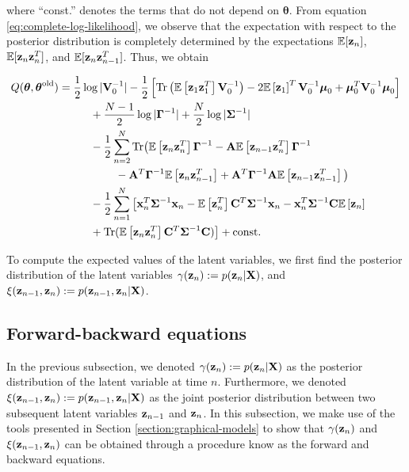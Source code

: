 \documentclass[12pt, oneside]{book}
\numberwithin{equation}{section}
\newcommand{\expectation}[1]{\mathbb{E}\left[#1\right]}
\newcommand{\x}{{\bf x}}
\newcommand{\z}{{\bf z}}
\begin{document}
{where ``const.'' denotes the terms that do not depend on $\boldsymbol{\theta}$. From equation \eqref{eq:complete-log-likelihood}, we observe that the expectation with respect to the posterior distribution is completely determined by the expectations $\mathbb{E}[\z_n]$, $\mathbb{E}[\z_n\z_{n}^{T}]$, and  $\mathbb{E}[\z_n\z_{n-1}^{T}]$. Thus, we obtain

\begin{align}
	Q(\boldsymbol\theta, \boldsymbol\theta^\text{old}) &= \frac{1}{2}\log \vert
	  {\bf V}_0^{-1}\vert -\frac{1}{2}\left[\text{Tr}\left(\mathbb{E}\left[\z_1 \z_1^T\right] {\bf V}_0^{-1}\right) -2 \mathbb{E}\left[\z_1\right]^T{\bf V}_0^{-1}\boldsymbol\mu_0 + \boldsymbol\mu_0^T {\bf V}_0^{-1}\boldsymbol\mu_0\right] \nonumber \\
	  &\hspace{1cm}+ \frac{N-1}{2}\log\vert\boldsymbol\Gamma^{-1}\vert + \frac{N}{2}\log\vert \boldsymbol\Sigma^{-1}\vert \nonumber \\
	  &\hspace{1cm}-\frac{1}{2} \sum_{n=2}^{N}\text{Tr}\big(\expectation{\z_n\z_n^T}\boldsymbol\Gamma^{-1} - {\bf A}\expectation{\z_{n-1}\z_n^T}\boldsymbol\Gamma^{-1} \nonumber\\
	  &\hspace{1.8cm} - {\bf A}^T\boldsymbol{\Gamma}^{-1}\expectation{\z_n\z_{n-1}^T} + {\bf A}^T\boldsymbol\Gamma^{-1}{\bf A}\expectation{\z_{n-1}\z_{n-1}^T}\big) \nonumber\\
	  &\hspace{1cm}-\frac{1}{2}\sum_{n=1}^N\big[\x_n^T\boldsymbol{\Sigma}^{-1}\x_n-\expectation{\z_n^T}{\bf C}^T \boldsymbol\Sigma^{-1}\x_n - \x_n^T\boldsymbol\Sigma^{-1}{\bf C}\expectation{\z_n} \nonumber\\
	  &\hspace{1cm} + \text{Tr}(\mathbb{E}\left[\z_n\z_n^T\right]{\bf C}^T\boldsymbol\Sigma^{-1}{\bf C})\big] + \text{const.}  \label{eq:Q-LDS}
\end{align}


To compute the expected values of the latent variables, we first find the posterior distribution of the latent variables $\gamma(\z_n) := p(\z_n\vert {\bf X})$, and $\xi(\z_{n-1}, \z_{n}) := p(\z_{n-1}, \z_n\vert {\bf X})$.

\subsection{Forward-backward equations}
In the previous subsection, we denoted $\gamma(\z_n) := p(\z_n\vert {\bf X})$ as the posterior distribution of the latent variable at time $n$. Furthermore, we denoted $\xi(\z_{n-1}, \z_{n}) := p(\z_{n-1}, \z_n\vert {\bf X})$ as the joint posterior distribution between two subsequent latent variables $\z_{n-1}$ and $\z_{n}$. In this subsection, we make use of the tools presented in Section \ref{section:graphical-models} to show that $\gamma(\z_n)$ and $\xi(\z_{n-1}, \z_{n})$ can be obtained through a procedure know as the forward and backward equations.

}
\end{document}
